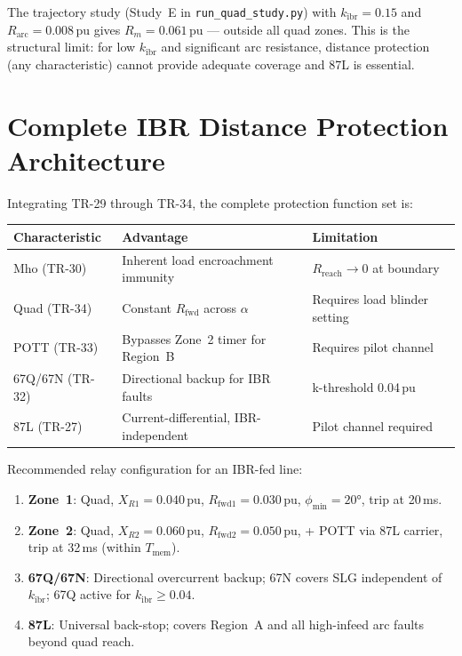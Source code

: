 \documentclass[11pt,a4paper]{article}
\begin{document}
\noindent
The trajectory study (Study~E in \texttt{run\_quad\_study.py}) with
$k_\mathrm{ibr}=0.15$ and $R_\mathrm{arc}=0.008$\,pu gives
$R_m=0.061$\,pu --- outside all quad zones.  This is the structural limit:
for low $k_\mathrm{ibr}$ and significant arc resistance, distance protection
(any characteristic) cannot provide adequate coverage and 87L is essential.

\section{Complete IBR Distance Protection Architecture}
\label{sec:architecture}

Integrating TR-29 through TR-34, the complete protection function set is:

\begin{center}
\begin{tabular}{@{}lll@{}}
\toprule
Characteristic & Advantage & Limitation\\
\midrule
Mho (TR-30)  & Inherent load encroachment immunity & $R_\mathrm{reach}\to 0$ at boundary\\
Quad (TR-34) & Constant $R_\mathrm{fwd}$ across $\alpha$ & Requires load blinder setting\\
POTT (TR-33) & Bypasses Zone~2 timer for Region~B & Requires pilot channel\\
67Q/67N (TR-32) & Directional backup for IBR faults & k-threshold 0.04\,pu\\
87L (TR-27)  & Current-differential, IBR-independent & Pilot channel required\\
\bottomrule
\end{tabular}
\end{center}

\medskip\noindent
Recommended relay configuration for an IBR-fed line:
\begin{enumerate}
  \item \textbf{Zone~1}: Quad, $X_{R1}=0.040$\,pu, $R_\mathrm{fwd1}=0.030$\,pu,
    $\phi_\mathrm{min}=20°$, trip at 20\,ms.
  \item \textbf{Zone~2}: Quad, $X_{R2}=0.060$\,pu, $R_\mathrm{fwd2}=0.050$\,pu,
    + POTT via 87L carrier, trip at 32\,ms (within $T_\mathrm{mem}$).
  \item \textbf{67Q/67N}: Directional overcurrent backup; 67N covers SLG
    independent of $k_\mathrm{ibr}$; 67Q active for $k_\mathrm{ibr}\geq0.04$.
  \item \textbf{87L}: Universal back-stop; covers Region~A and all high-infeed
    arc faults beyond quad reach.
\end{enumerate}
\end{document}
